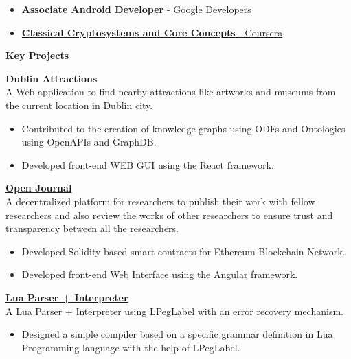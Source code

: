 \documentclass{article}
\begin{document}
\begin{itemize}[noitemsep,nolistsep,leftmargin=*]
    \item { \normalsize \href{https://www.credential.net/623b189c-719c-4845-b489-1b1618d4da79}{\textbf{Associate Android Developer} - Google Developers } }
    \item { \normalsize \href{https://www.coursera.org/account/accomplishments/certificate/X4CNCJXC335V}{\textbf{Classical Cryptosystems and Core Concepts} - Coursera} }
\end{itemize}
\vspace{5pt}
\noindent \large \textbf{\textcolor{NavyBlue}{Key Projects}} \vspace{5pt}

\noindent \normalsize \textbf{Dublin Attractions} \\
\noindent \normalsize A Web application to find nearby attractions like artworks and museums from the current location in Dublin city.
\begin{itemize}
    \item Contributed to the creation of knowledge graphs using ODFs and Ontologies using OpenAPIs and GraphDB. 
    \item Developed front-end WEB GUI using the React framework.
\end{itemize}
\vspace{5pt}

\noindent \normalsize \href{https://github.com/kdpisda/scientific-journal-blockchain}{\textbf{Open Journal}} \\
\noindent \normalsize A decentralized platform for researchers to publish their work with fellow researchers and also review the works of other researchers to ensure trust and transparency between all the researchers.
\begin{itemize}
    \item Developed Solidity based smart contracts for Ethereum Blockchain Network.
    \item Developed front-end Web Interface using the Angular framework.
\end{itemize}
\vspace{5pt}

\noindent \normalsize \href{https://gist.github.com/0a9d7b1a040249d1b525ab94198a42ac}{\textbf{Lua Parser + Interpreter}} \\
\noindent \normalsize A Lua Parser + Interpreter using LPegLabel with an error recovery mechanism.
\begin{itemize}
    \item Designed a simple compiler based on a specific grammar definition in Lua Programming language with the help of LPegLabel.
\end{itemize}
\vspace{5pt}
\end{document}
